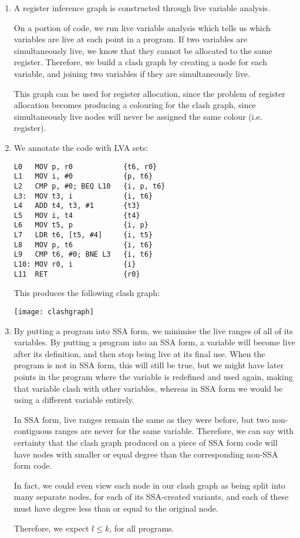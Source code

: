 


\begin{enumerate}[label=(\alph*)]

  \item
    A register inference graph is constructed through live variable analysis.

    On a portion of code, we run live variable analysis which tells us which variables are live at each point in a program. If two variables are simultaneously live, we know that they cannot be allocated to the same register. Therefore, we build a clash graph by creating a node for each variable, and joining two variables if they are simultaneously live.

    This graph can be used for register allocation, since the problem of register allocation becomes producing a colouring for the clash graph, since simultaneously live nodes will never be assigned the same colour (i.e. register).

    \item

      We annotate the code with LVA sets:

\begin{verbatim}
L0   MOV p, r0            {t6, r0}
L1   MOV i, #0            {p, t6}
L2   CMP p, #0; BEQ L10   {i, p, t6}
L3:  MOV t3, i            {i, t6}
L4   ADD t4, t3, #1       {t3}
L5   MOV i, t4            {t4}
L6   MOV t5, p            {i, p}
L7   LDR t6, [t5, #4]     {i, t5}
L8   MOV p, t6            {i, t6}
L9   CMP t6, #0; BNE L3   {i, t6}
L10: MOV r0, i            {i}
L11  RET                  {r0}
\end{verbatim}

This produces the following clash graph:

\texttt{[image: clashgraph]}

\item
  By putting a program into SSA form, we minimise the live ranges of all of its variables. By putting a program into an SSA form, a variable will become live after its definition, and then stop being live at its final use. When the program is not in SSA form, this will still be true, but we might have later points in the program where the variable is redefined and used again, making that variable clash with other variables, whereas in SSA form we would be using a different variable entirely.

  In SSA form, live ranges remain the same as they were before, but two non-contiguous ranges are never for the same variable. Therefore, we can say with certainty that the clash graph produced on a piece of SSA form code will have nodes with smaller or equal degree than the corresponding non-SSA form code.

  In fact, we could even view each node in our clash graph as being split into many separate nodes, for each of its SSA-created variants, and each of these must have degree less than or equal to the original node.

  Therefore, we expect $l \leq k$, for all programs.
        
    \end{enumerate}

